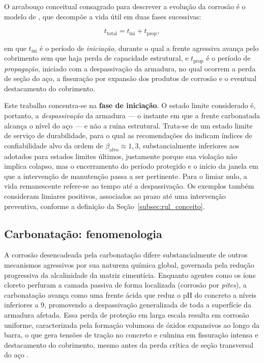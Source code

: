 O arcabouço conceitual consagrado para descrever a evolução da corrosão é o modelo de \textcite{tuutti1982}, que decompõe a vida útil em duas fases sucessivas:

\begin{equation}\label{eq:tuutti}
t_{\mathrm{total}} = t_{\mathrm{ini}} + t_{\mathrm{prop}},
\end{equation}

\noindent em que $t_{\mathrm{ini}}$ é o período de \textit{iniciação}, durante o qual a frente agressiva avança pelo cobrimento sem que haja perda de capacidade estrutural, e $t_{\mathrm{prop}}$ é o período de \textit{propagação}, iniciado com a despassivação da armadura, no qual ocorrem a perda de seção do aço, a fissuração por expansão dos produtos de corrosão e o eventual destacamento do cobrimento.

Este trabalho concentra-se na \textbf{fase de iniciação}. O estado limite considerado é, portanto, a \textit{despassivação} da armadura --- o instante em que a frente carbonatada alcança o nível do aço --- e não a ruína estrutural. Trata-se de um estado limite de serviço de durabilidade, para o qual as recomendações do \textcite{fib2006} indicam índices de confiabilidade alvo da ordem de $\beta_{\mathrm{alvo}} \approx 1{,}3$, substancialmente inferiores aos adotados para estados limites últimos, justamente porque sua violação não implica colapso, mas o encerramento do período protegido e o início da janela em que a intervenção de manutenção passa a ser pertinente. Para o limiar nulo, a vida remanescente refere-se ao tempo até a despassivação. Os exemplos também consideram limiares positivos, associados ao prazo até uma intervenção preventiva, conforme a definição da Seção~\ref{subsec:rul_conceito}.

\subsection{Carbonata\c{c}\~ao: fenomenologia}
\label{subsub:fenomenologia}

A corrosão desencadeada pela carbonatação difere substancialmente de outros mecanismos agressivos por sua natureza química global, governada pela redução progressiva da alcalinidade da matriz cimentícia. Enquanto agentes como os íons cloreto perfuram a camada passiva de forma localizada (corrosão por \textit{pites}), a carbonatação avança como uma frente ácida que reduz o pH do concreto a níveis inferiores a 9, promovendo a despassivação generalizada de toda a superfície da armadura afetada. Essa perda de proteção em larga escala resulta em corrosão uniforme, caracterizada pela formação volumosa de óxidos expansivos ao longo da barra, o que gera tensões de tração no concreto e culmina em fissuração intensa e destacamento do cobrimento, mesmo antes da perda crítica de seção transversal do aço \parencite{tuutti1982}.

